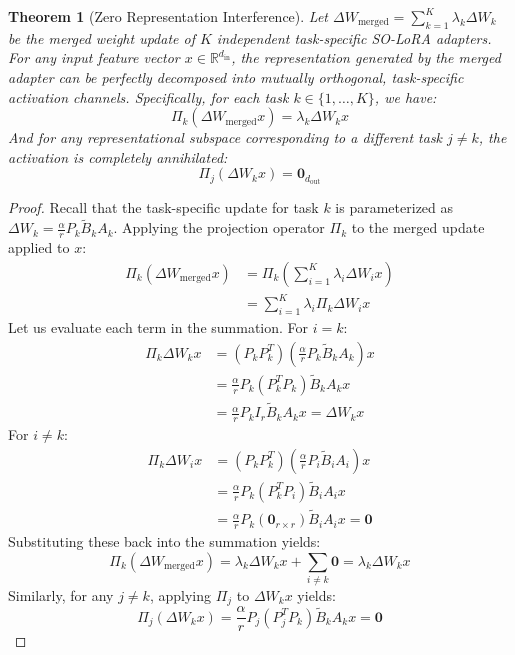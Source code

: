 \documentclass{article}
\theoremstyle{plain}
\newtheorem{theorem}{Theorem}[section]
\theoremstyle{definition}
\theoremstyle{remark}
\begin{document}
\begin{theorem}[Zero Representation Interference]
\label{thm:zero_interference}
Let $\Delta W_{\text{merged}} = \sum_{k=1}^K \lambda_k \Delta W_k$ be the merged weight update of $K$ independent task-specific SO-LoRA adapters. For any input feature vector $x \in \mathbb{R}^{d_{\text{in}}}$, the representation generated by the merged adapter can be perfectly decomposed into mutually orthogonal, task-specific activation channels. Specifically, for each task $k \in \{1, \dots, K\}$, we have:
\begin{equation}
  \Pi_k (\Delta W_{\text{merged}} x) = \lambda_k \Delta W_k x
\end{equation}
And for any representational subspace corresponding to a different task $j \neq k$, the activation is completely annihilated:
\begin{equation}
  \Pi_j (\Delta W_k x) = \mathbf{0}_{d_{\text{out}}}
\end{equation}
\end{theorem}

\begin{proof}
Recall that the task-specific update for task $k$ is parameterized as $\Delta W_k = \frac{\alpha}{r} P_k \tilde{B}_k A_k$. Applying the projection operator $\Pi_k$ to the merged update applied to $x$:
\begin{align}
  \Pi_k (\Delta W_{\text{merged}} x) &= \Pi_k \left( \sum_{i=1}^K \lambda_i \Delta W_i x \right) \\
  &= \sum_{i=1}^K \lambda_i \Pi_k \Delta W_i x
\end{align}
Let us evaluate each term in the summation. For $i = k$:
\begin{align}
  \Pi_k \Delta W_k x &= (P_k P_k^T) \left( \frac{\alpha}{r} P_k \tilde{B}_k A_k \right) x \\
  &= \frac{\alpha}{r} P_k (P_k^T P_k) \tilde{B}_k A_k x \\
  &= \frac{\alpha}{r} P_k I_r \tilde{B}_k A_k x = \Delta W_k x
\end{align}
For $i \neq k$:
\begin{align}
  \Pi_k \Delta W_i x &= (P_k P_k^T) \left( \frac{\alpha}{r} P_i \tilde{B}_i A_i \right) x \\
  &= \frac{\alpha}{r} P_k (P_k^T P_i) \tilde{B}_i A_i x \\
  &= \frac{\alpha}{r} P_k (\mathbf{0}_{r \times r}) \tilde{B}_i A_i x = \mathbf{0}
\end{align}
Substituting these back into the summation yields:
\begin{equation}
  \Pi_k (\Delta W_{\text{merged}} x) = \lambda_k \Delta W_k x + \sum_{i \neq k} \mathbf{0} = \lambda_k \Delta W_k x
\end{equation}
Similarly, for any $j \neq k$, applying $\Pi_j$ to $\Delta W_k x$ yields:
\begin{equation}
  \Pi_j (\Delta W_k x) = \frac{\alpha}{r} P_j (P_j^T P_k) \tilde{B}_k A_k x = \mathbf{0}
\end{equation}
\end{proof}
\end{document}
